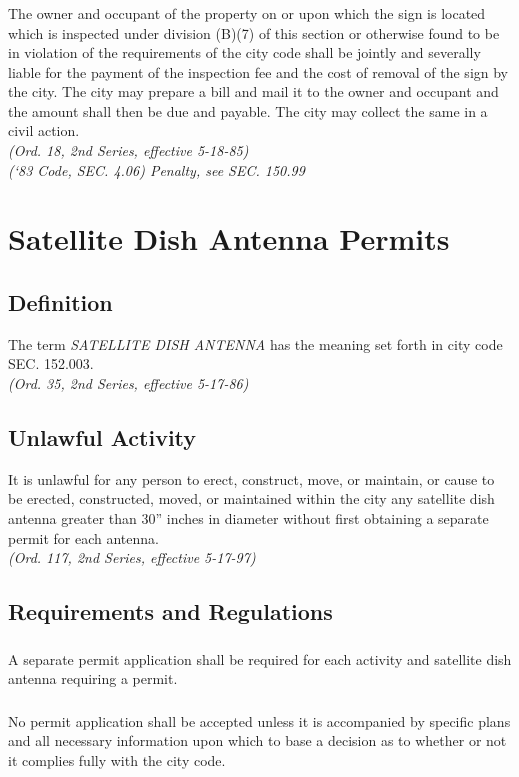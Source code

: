 \subsubsection{}
The owner and occupant of the property on or upon which the sign is located which is inspected under division (B)(7) of this section or otherwise found to be in violation of the requirements of the city code shall be jointly and severally liable for the payment of the inspection fee and the cost of removal of the sign by the city. The city may prepare a bill and mail it to the owner and occupant and the amount shall then be due and payable. The city may collect the same in a civil action.\\
\emph{(Ord. 18, 2nd Series, effective 5-18-85)}\\
\emph{(‘83 Code, SEC. 4.06)  Penalty, see SEC. 150.99}
\section{Satellite Dish Antenna Permits}
\subsection{Definition}
The term \emph{SATELLITE DISH ANTENNA} has the meaning set forth in city code SEC. 152.003.\\
\emph{(Ord. 35, 2nd Series, effective 5-17-86)}
\subsection{Unlawful Activity}
It is unlawful for any person to erect, construct, move, or maintain, or cause to be erected, constructed, moved, or maintained within the city any satellite dish antenna greater than 30” inches in diameter without first obtaining a separate permit for each antenna.\\
\emph{(Ord. 117, 2nd Series, effective 5-17-97)}
\subsection{Requirements and Regulations}
\subsubsection{}
A separate permit application shall be required for each activity and satellite dish antenna requiring a permit.
\subsubsection{}
No permit application shall be accepted unless it is accompanied by specific plans and all necessary information upon which to base a decision as to whether or not it complies fully with the city code.
